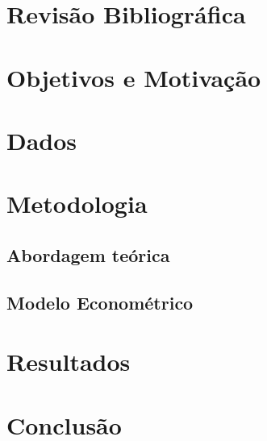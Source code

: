 \documentclass[
	article,			%
	12pt,				%
	oneside,			%
	a4paper,			%
	english,			%
	brazil				%
	]{abntex2}
\begin{document}
\section{Revisão Bibliográfica}

\section{Objetivos e Motivação}


\section{Dados}

\section{Metodologia}
\subsection{Abordagem teórica}

 

\subsection{Modelo Econométrico}


\section{Resultados}


\section{Conclusão}
\end{document}
